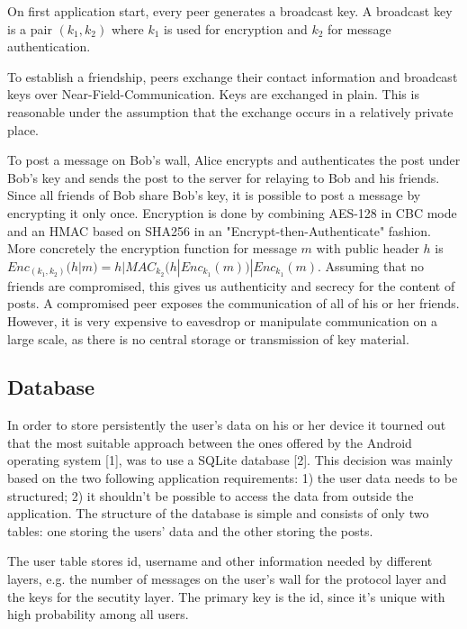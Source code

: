 \documentclass{report}
\begin{document}
On first application start, every peer generates a broadcast key. A broadcast key is a pair $(k_1, k_2)$ where $k_1$ is used for encryption and $k_2$ for message authentication.

To establish a friendship, peers exchange their contact information and broadcast keys over Near-Field-Communication. Keys are exchanged in plain. This is reasonable under the assumption that the exchange occurs in a relatively private place.

To post a message on Bob's wall, Alice encrypts and authenticates the post under Bob's key and sends the post to the server for relaying to Bob and his friends. Since all friends of Bob share Bob's key, it is possible to post a message by encrypting it only once. Encryption is done by combining AES-128 in CBC mode and an HMAC based on SHA256 in an "Encrypt-then-Authenticate" fashion. More concretely the encryption function for message $m$ with public header $h$ is \newline
$Enc_{(k_1, k_2)}(h|m) = h | MAC_{k_2}(h | Enc_{k_1}(m)) | Enc_{k_1}(m)$.
\newline
Assuming that no friends are compromised, this gives us authenticity and secrecy for the content of posts. A compromised peer exposes the communication of all of his or her friends. However, it is very expensive to eavesdrop or manipulate communication on a large scale, as there is no central storage or transmission of key material.

\subsection{Database}
In order to store persistently the user's data on his or her device it tourned out that the most suitable approach between the ones offered by the Android operating system [1], was to use a SQLite database [2]. This decision was mainly based on the two following application requirements:
1) the user data needs to be structured;
2) it shouldn't be possible to access the data from outside the application.
The structure of the database is simple and consists of only two tables: one storing the users' data and the other storing the posts.

The user table stores id, username and other information needed by different layers, e.g. the number of messages on the user's wall for the protocol layer and the keys for the secutity layer. The primary key is the id, since it's unique with high probability among all users.
\end{document}
